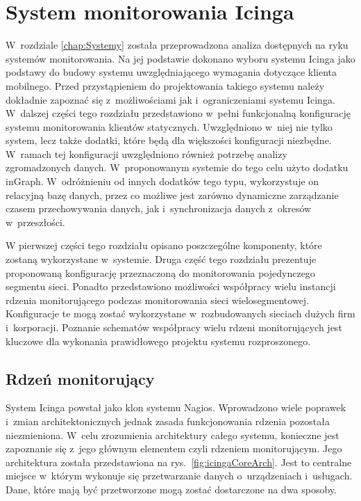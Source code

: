 \chapter{System monitorowania Icinga}
\label{chap:Icinga}

W~rozdziale \ref{chap:Systemy} została przeprowadzona analiza
dostępnych na ryku systemów monitorowania. Na jej podstawie dokonano
wyboru systemu Icinga jako podstawy do budowy systemu uwzględniającego
wymagania dotyczące klienta mobilnego. Przed przystąpieniem do
projektowania takiego systemu należy dokładnie zapoznać się
z~możliwościami jak i~ograniczeniami systemu Icinga. W~dalszej części
tego rozdziału przedstawiono w~pełni funkcjonalną konfigurację systemu
monitorowania klientów statycznych. Uwzględniono w~niej nie tylko
system, lecz także dodatki, które będą dla większości konfiguracji
niezbędne. W~ramach tej konfiguracji uwzględniono również potrzebę
analizy zgromadzonych danych. W~proponowanym systemie do tego celu
użyto dodatku inGraph. W~odróżnieniu od innych dodatków tego typu,
wykorzystuje on relacyjną bazę danych, przez co możliwe jest zarówno
dynamiczne zarządzanie czasem przechowywania danych, jak
i~synchronizacja danych z~okresów w~przeszłości.

W pierwszej części tego rozdziału opisano poszczególne komponenty,
które zostaną wykorzystane w~systemie. Druga część tego rozdziału
prezentuje proponowaną konfigurację przeznaczoną do monitorowania
pojedynczego segmentu sieci. Ponadto przedstawiono możliwości
współpracy wielu instancji rdzenia monitorującego podczas
monitorowania sieci wielosegmentowej. Konfiguracje te mogą zostać
wykorzystane w~rozbudowanych sieciach dużych firm
i~korporacji. Poznanie schematów współpracy wielu rdzeni
monitorujących jest kluczowe dla wykonania prawidłowego projektu
systemu rozproszonego.

\section[Rdzeń monitorujący][Rdzeń monitorujący]{Rdzeń monitorujący}
\label{sec:IcingaCore}

System Icinga powstał jako klon systemu Nagios. Wprowadzono wiele
poprawek i~zmian architektonicznych jednak zasada funkcjonowania
rdzenia pozostała niezmieniona. W~celu zrozumienia architektury całego
systemu, konieczne jest zapoznanie się z~jego głównym elementem czyli
rdzeniem monitorującym. Jego architektura została przedstawiona na
rys.~\ref{fig:icingaCoreArch}. Jest to centralne miejsce w~którym
wykonuje się przetwarzanie danych o~urządzeniach i~usługach. Dane,
które mają być przetworzone mogą zostać dostarczone na dwa sposoby.

